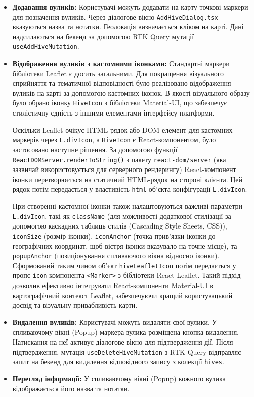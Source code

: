 \begin{itemize}
    \item \textbf{Додавання вуликів:} Користувачі можуть додавати на карту точкові маркери для позначення вуликів. Через діалогове вікно \texttt{AddHiveDialog.tsx} вказуються назва та нотатки. Геолокація визначається кліком на карті. Дані надсилаються на бекенд за допомогою RTK Query мутації \texttt{useAddHiveMutation}.
    
    \item \textbf{Відображення вуликів з кастомними іконками:} 
    Стандартні маркери бібліотеки Leaflet є досить загальними. Для покращення візуального сприйняття та тематичної відповідності було реалізовано відображення вуликів на карті за допомогою кастомних іконок. В якості візуального образу було обрано іконку \texttt{HiveIcon} з бібліотеки Material-UI, що забезпечує стилістичну єдність з іншими елементами інтерфейсу платформи. 
    
    Оскільки Leaflet очікує HTML-рядок або DOM-елемент для кастомних маркерів через \texttt{L.divIcon}, а \texttt{HiveIcon} є React-компонентом, було застосовано наступне рішення. За допомогою функції \texttt{ReactDOMServer.renderToString()} з пакету \texttt{react-dom/server} (яка зазвичай використовується для серверного рендерингу) React-компонент іконки перетворюється на статичний HTML-рядок на стороні клієнта. Цей рядок потім передається у властивість \texttt{html} об'єкта конфігурації \texttt{L.divIcon}. 
    
    При створенні кастомної іконки також налаштовуються важливі параметри \texttt{L.divIcon}, такі як \texttt{className} (для можливості додаткової стилізації за допомогою каскадних таблиць стилів (Cascading Style Sheets, CSS)), \texttt{iconSize} (розмір іконки), \texttt{iconAnchor} (точка прив'язки іконки до географічних координат, щоб вістря іконки вказувало на точне місце), та \texttt{popupAnchor} (позиціонування спливаючого вікна відносно іконки). Сформований таким чином об'єкт \texttt{hiveLeafletIcon} потім передається у пропс \texttt{icon} компонента \texttt{<Marker>} з бібліотеки React-Leaflet. Такий підхід дозволив ефективно інтегрувати React-компоненти Material-UI в картографічний контекст Leaflet, забезпечуючи кращий користувацький досвід та візуальну привабливість карти.

    \item \textbf{Видалення вуликів:} Користувачі можуть видаляти свої вулики. У спливаючому вікні (Popup) маркера вулика розміщена кнопка видалення. Натискання на неї активує діалогове вікно для підтвердження дії. Після підтвердження, мутація \texttt{useDeleteHiveMutation} з RTK Query відправляє запит на бекенд для видалення відповідного запису з колекції \texttt{hives}.
    \item \textbf{Перегляд інформації:} У спливаючому вікні (Popup) кожного вулика відображається його назва та нотатки.
\end{itemize}

